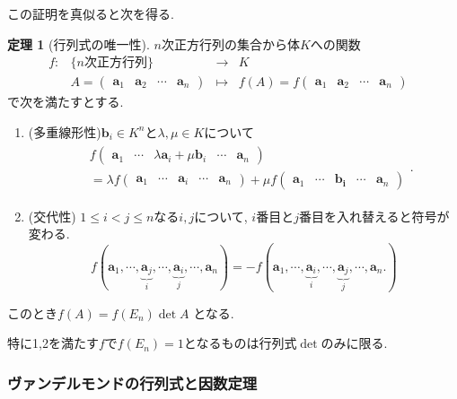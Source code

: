 \documentclass[dvipdfmx,a4paper,11pt]{article} %
\theoremstyle{definition}
\newtheorem{thm}{定理}
\begin{document}
この証明を真似ると次を得る. 
    \begin{thm}[行列式の唯一性]
    \label{thm-det}
    $n$次正方行列の集合から体$K$への関数
    $$
\begin{array}{ccccc}
f: &\{\text{$n$次正方行列} \}& \rightarrow & K& \\
&
A
=
    \begin{pmatrix}
    \bm{a}_1&\bm{a}_2&\cdots&\bm{a}_n
    \end{pmatrix}
 & 
 \longmapsto & 
 f(A)=f\begin{pmatrix}
    \bm{a}_1&\bm{a}_2&\cdots&\bm{a}_n
    \end{pmatrix}
 &
\end{array}
$$
で次を満たすとする.
       \begin{enumerate}
    \setlength{\parskip}{0cm} 
  \setlength{\itemsep}{0cm}
\item (多重線形性)$\bm{b}_{i} \in K^n$と$\lambda, \mu \in K$について
\begin{align*}
\begin{split}
&f\begin{pmatrix}
    \bm{a}_1&\cdots&\lambda\bm{a}_i+\mu\bm{b}_i&\cdots&\bm{a}_n
    \end{pmatrix} \\
&=
\lambda f\begin{pmatrix}
    \bm{a}_1&\cdots&\bm{a}_i&\cdots&\bm{a}_n
    \end{pmatrix}
+
\mu f\begin{pmatrix}
    \bm{a}_1&\cdots&\bm{b_i}&\cdots&\bm{a}_n
    \end{pmatrix}
    \end{split}.
\end{align*}
\item (交代性) $1\le i< j \le n$なる$i,j$について, $i$番目と$j$番目を入れ替えると符号が変わる. 
$$
f(
    \bm{a}_1, \cdots, \underbrace{\bm{a}_j}_{i}, \cdots , \underbrace{\bm{a}_i}_{j}, \cdots, \bm{a}_n
)
=
-f(
    \bm{a}_1, \cdots, \underbrace{\bm{a}_i}_{i}, \cdots , \underbrace{\bm{a}_j}_{j}, \cdots, \bm{a}_n.
)
$$
  \end{enumerate}
 このとき$ f(A) = f(E_n) \det A$
 となる.
 
 特に1,2を満たす$f$で$f(E_n)=1$となるものは行列式$\det$のみに限る. 
     \end{thm}
 
\subsubsection{ヴァンデルモンドの行列式と因数定理}
\end{document}

